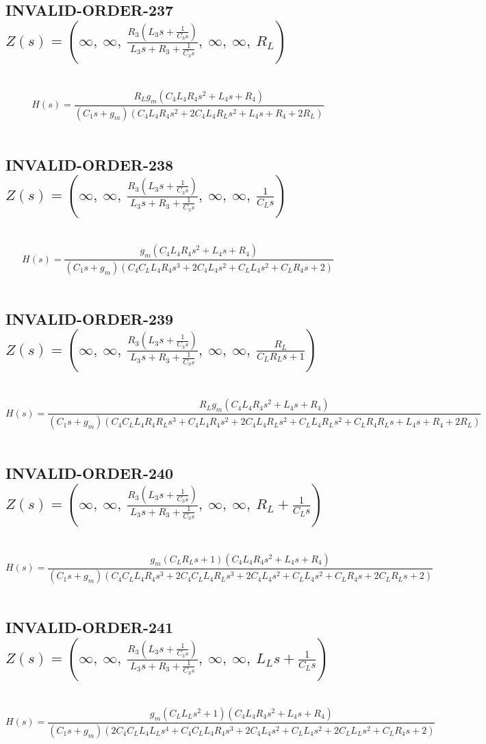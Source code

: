 \documentclass{article}
\begin{document}
\subsection{INVALID-ORDER-237 $Z(s) = \left( \infty, \  \infty, \  \frac{R_{3} \left(L_{3} s + \frac{1}{C_{3} s}\right)}{L_{3} s + R_{3} + \frac{1}{C_{3} s}}, \  \infty, \  \infty, \  R_{L}\right)$ } \ 
\textbf{\[H(s) = \frac{R_{L} g_{m} \left(C_{4} L_{4} R_{4} s^{2} + L_{4} s + R_{4}\right)}{\left(C_{1} s + g_{m}\right) \left(C_{4} L_{4} R_{4} s^{2} + 2 C_{4} L_{4} R_{L} s^{2} + L_{4} s + R_{4} + 2 R_{L}\right)}\] } \ 
\subsection{INVALID-ORDER-238 $Z(s) = \left( \infty, \  \infty, \  \frac{R_{3} \left(L_{3} s + \frac{1}{C_{3} s}\right)}{L_{3} s + R_{3} + \frac{1}{C_{3} s}}, \  \infty, \  \infty, \  \frac{1}{C_{L} s}\right)$ } \ 
\textbf{\[H(s) = \frac{g_{m} \left(C_{4} L_{4} R_{4} s^{2} + L_{4} s + R_{4}\right)}{\left(C_{1} s + g_{m}\right) \left(C_{4} C_{L} L_{4} R_{4} s^{3} + 2 C_{4} L_{4} s^{2} + C_{L} L_{4} s^{2} + C_{L} R_{4} s + 2\right)}\] } \ 
\subsection{INVALID-ORDER-239 $Z(s) = \left( \infty, \  \infty, \  \frac{R_{3} \left(L_{3} s + \frac{1}{C_{3} s}\right)}{L_{3} s + R_{3} + \frac{1}{C_{3} s}}, \  \infty, \  \infty, \  \frac{R_{L}}{C_{L} R_{L} s + 1}\right)$ } \ 
\textbf{\[H(s) = \frac{R_{L} g_{m} \left(C_{4} L_{4} R_{4} s^{2} + L_{4} s + R_{4}\right)}{\left(C_{1} s + g_{m}\right) \left(C_{4} C_{L} L_{4} R_{4} R_{L} s^{3} + C_{4} L_{4} R_{4} s^{2} + 2 C_{4} L_{4} R_{L} s^{2} + C_{L} L_{4} R_{L} s^{2} + C_{L} R_{4} R_{L} s + L_{4} s + R_{4} + 2 R_{L}\right)}\] } \ 
\subsection{INVALID-ORDER-240 $Z(s) = \left( \infty, \  \infty, \  \frac{R_{3} \left(L_{3} s + \frac{1}{C_{3} s}\right)}{L_{3} s + R_{3} + \frac{1}{C_{3} s}}, \  \infty, \  \infty, \  R_{L} + \frac{1}{C_{L} s}\right)$ } \ 
\textbf{\[H(s) = \frac{g_{m} \left(C_{L} R_{L} s + 1\right) \left(C_{4} L_{4} R_{4} s^{2} + L_{4} s + R_{4}\right)}{\left(C_{1} s + g_{m}\right) \left(C_{4} C_{L} L_{4} R_{4} s^{3} + 2 C_{4} C_{L} L_{4} R_{L} s^{3} + 2 C_{4} L_{4} s^{2} + C_{L} L_{4} s^{2} + C_{L} R_{4} s + 2 C_{L} R_{L} s + 2\right)}\] } \ 
\subsection{INVALID-ORDER-241 $Z(s) = \left( \infty, \  \infty, \  \frac{R_{3} \left(L_{3} s + \frac{1}{C_{3} s}\right)}{L_{3} s + R_{3} + \frac{1}{C_{3} s}}, \  \infty, \  \infty, \  L_{L} s + \frac{1}{C_{L} s}\right)$ } \ 
\textbf{\[H(s) = \frac{g_{m} \left(C_{L} L_{L} s^{2} + 1\right) \left(C_{4} L_{4} R_{4} s^{2} + L_{4} s + R_{4}\right)}{\left(C_{1} s + g_{m}\right) \left(2 C_{4} C_{L} L_{4} L_{L} s^{4} + C_{4} C_{L} L_{4} R_{4} s^{3} + 2 C_{4} L_{4} s^{2} + C_{L} L_{4} s^{2} + 2 C_{L} L_{L} s^{2} + C_{L} R_{4} s + 2\right)}\] } \ 
\end{document}
